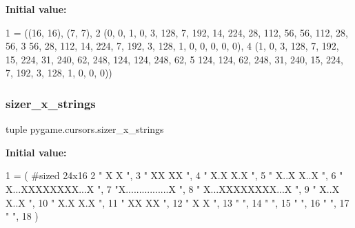 {\bfseries Initial value\+:}
\begin{DoxyCode}
1 =  ((16, 16), (7, 7),
2     (0, 0, 1, 0, 3, 128, 7, 192, 14, 224, 28, 112, 56, 56, 112, 28, 56,
3      56, 28, 112, 14, 224, 7, 192, 3, 128, 1, 0, 0, 0, 0, 0),
4     (1, 0, 3, 128, 7, 192, 15, 224, 31, 240, 62, 248, 124, 124, 248, 62,
5      124, 124, 62, 248, 31, 240, 15, 224, 7, 192, 3, 128, 1, 0, 0, 0))
\end{DoxyCode}
\mbox{\label{namespacepygame_1_1cursors_a9e8996ddcf02b7a1f494f6ee00a9bf52}} 
\subsubsection{\texorpdfstring{sizer\+\_\+x\+\_\+strings}{sizer\_x\_strings}}
{\footnotesize\ttfamily tuple pygame.\+cursors.\+sizer\+\_\+x\+\_\+strings}

{\bfseries Initial value\+:}
\begin{DoxyCode}
1 =  (               \textcolor{comment}{#sized 24x16}
2  \textcolor{stringliteral}{"     X      X           "},
3  \textcolor{stringliteral}{"    XX      XX          "},
4  \textcolor{stringliteral}{"   X.X      X.X         "},
5  \textcolor{stringliteral}{"  X..X      X..X        "},
6  \textcolor{stringliteral}{" X...XXXXXXXX...X       "},
7  \textcolor{stringliteral}{"X................X      "},
8  \textcolor{stringliteral}{" X...XXXXXXXX...X       "},
9  \textcolor{stringliteral}{"  X..X      X..X        "},
10  \textcolor{stringliteral}{"   X.X      X.X         "},
11  \textcolor{stringliteral}{"    XX      XX          "},
12  \textcolor{stringliteral}{"     X      X           "},
13  \textcolor{stringliteral}{"                        "},
14  \textcolor{stringliteral}{"                        "},
15  \textcolor{stringliteral}{"                        "},
16  \textcolor{stringliteral}{"                        "},
17  \textcolor{stringliteral}{"                        "},
18 )
\end{DoxyCode}
\mbox{\label{namespacepygame_1_1cursors_a9647ff45f5032a1cfd9745fbcb588512}} 

